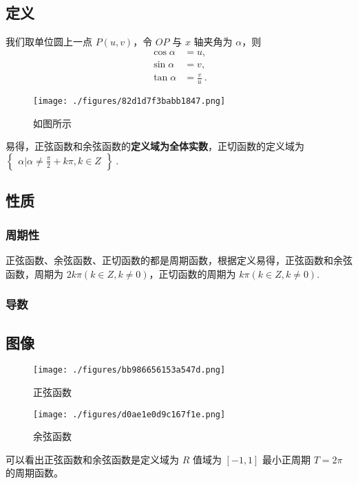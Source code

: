 \subsection{定义}
我们取单位圆上一点 $P(u,v)$，令 $OP$ 与 $x$ 轴夹角为 $\alpha$，则 
\begin{equation}
\begin{aligned}
\cos\alpha &= u,\\
\sin\alpha &= v,\\
\tan\alpha &= \frac{v}{u}~.
\end{aligned}
\end{equation}
\begin{figure}[ht]
\centering
\texttt{[image: ./figures/82d1d7f3babb1847.png]}
\caption{如图所示} \label{fig_HsTrFu_3}
\end{figure}
易得，正弦函数和余弦函数的\textbf{定义域为全体实数}，正切函数的定义域为 $\begin{Bmatrix}\alpha|\alpha \neq \frac{\pi}{2}+k\pi,k\in Z\end{Bmatrix}~.$

\subsection{性质}

\subsubsection{周期性}
正弦函数、余弦函数、正切函数的都是周期函数，根据定义易得，正弦函数和余弦函数，周期为 $2k\pi(k\in Z,k\neq0)$，正切函数的周期为 $k\pi(k\in Z,k\neq0)$.
\subsubsection{导数}

\subsection{图像}

\begin{figure}[ht]
\centering
\texttt{[image: ./figures/bb986656153a547d.png]}
\caption{正弦函数} \label{fig_HsTrFu_1}
\end{figure}
\begin{figure}[ht]
\centering
\texttt{[image: ./figures/d0ae1e0d9c167f1e.png]}
\caption{余弦函数} \label{fig_HsTrFu_2}
\end{figure}
可以看出正弦函数和余弦函数是定义域为 $R$ 值域为 $[-1,1]$ 最小正周期 $T = 2\pi$ 的周期函数。

